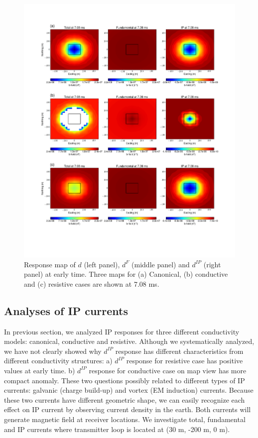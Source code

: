 \documentclass[a4paper, 11pt]{article}
\newcommand{\dip}{d^{IP}}
\begin{document}
\begin{figure}[htb]
  \centering  \includegraphics[width=1.0\textwidth]{figures/threecasesresp/IPresp_ch38.png}
  \caption{Response map of $d$ (left panel), $d^{F}$ (middle panel) and $d^{IP}$ (right panel) at early time. Three maps for  (a) Canonical, (b) conductive and (c) resistive cases are shown at 7.08 ms.}
  \label{F:IPresp2}
\end{figure}
\clearpage



\subsection{Analyses of IP currents}
In previous section, we analyzed IP responses for three different conductivity models: canonical, conductive and resistive. Although we systematically analyzed, we have not clearly showed why $\dip$ response has different characteristics from different conductivity structures: a) $\dip$ response for resistive case has positive values at early time. b) $\dip$ response for conductive case on map view has more compact anomaly. These two questions possibly related to different types of IP currents: galvanic (charge build-up) and vortex (EM induction) currents. Because these two currents have different geometric shape, we can easily recognize each effect on IP current by observing current density in the earth. Both currents will generate magnetic field at receiver locations. We investigate total, fundamental and IP currents where transmitter loop is located at (30 m, -200 m, 0 m). 
\end{document}
